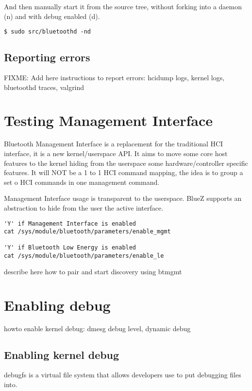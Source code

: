 \documentclass[11pt]{article}
\begin{document}
And then manually start it from the source tree, without forking into a daemon
(n) and with debug enabled (d).

\begin{verbatim}
$ sudo src/bluetoothd -nd
\end{verbatim}

\subsection{Reporting errors}
FIXME: Add here instructions to report errors: hcidump logs, kernel logs, bluetoothd traces, valgrind

\section{Testing Management Interface}

Bluetooth Management Interface is a replacement for the traditional HCI
interface, it is a new kernel/userspace API. It aims to move some core host
features to the kernel hiding from the userspace some hardware/controller
specific features. It will NOT be a 1 to 1 HCI command mapping, the idea is
to group a set o HCI commands in one management command.

Management Interface usage is transparent to the userspace. BlueZ supports
an abstraction to hide from the user the active interface.

\begin{verbatim}
'Y' if Management Interface is enabled
cat /sys/module/bluetooth/parameters/enable_mgmt

'Y' if Bluetooth Low Energy is enabled
cat /sys/module/bluetooth/parameters/enable_le
\end{verbatim}

describe here how to pair and start discovery using btmgmt


\section{Enabling debug}

howto enable kernel debug: dmesg debug level, dynamic debug

\subsection{Enabling kernel debug}

debugfs is a virtual file system that allows developers use to put debugging files into.
\end{document}
